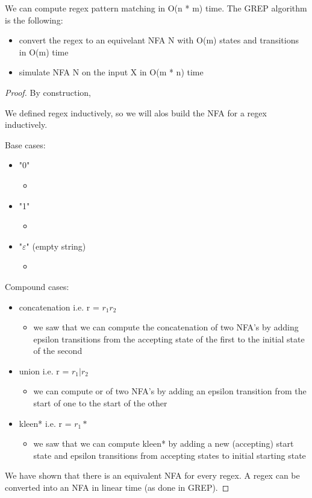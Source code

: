 We can compute regex pattern matching in O(n * m) time. The GREP algorithm is the following:
\begin{itemize}
    \item convert the regex to an equivelant NFA N with O(m) states and transitions in O(m) time
    \item simulate NFA N on the input X in O(m * n) time
\end{itemize}

\begin{proof}
    By construction,

    We defined regex inductively, so we will alos build the NFA for a regex inductively.

    Base cases:
    \begin{itemize}
        \item "0" 
        \begin{itemize}
            \item {}
        \end{itemize}
        \item "1"
        \begin{itemize}
            \item {}
        \end{itemize}
        \item "$\varepsilon$" (empty string)
        \begin{itemize}
            \item {}
        \end{itemize}
    \end{itemize}

    Compound cases:
    \begin{itemize}
        \item concatenation i.e. r = $r_1r_2$
        \begin{itemize}
            \item we saw that we can compute the concatenation of two NFA's by adding epsilon transitions from the accepting state of the first to the initial state of the second
        \end{itemize}
        \item union i.e. r = $r_1 | r_2$
        \begin{itemize}
            \item we can compute or of two NFA's by adding an epsilon transition from the start of one to the start of the other
        \end{itemize}
        \item kleen* i.e. r = $r_1*$
        \begin{itemize}
            \item we saw that we can compute kleen* by adding a new (accepting) start state and epsilon transitions from accepting states to initial starting state
        \end{itemize}
    \end{itemize}

    We have shown that there is an equivalent NFA for every regex. A regex can be converted into an NFA in linear time (as done in GREP).
\end{proof}

